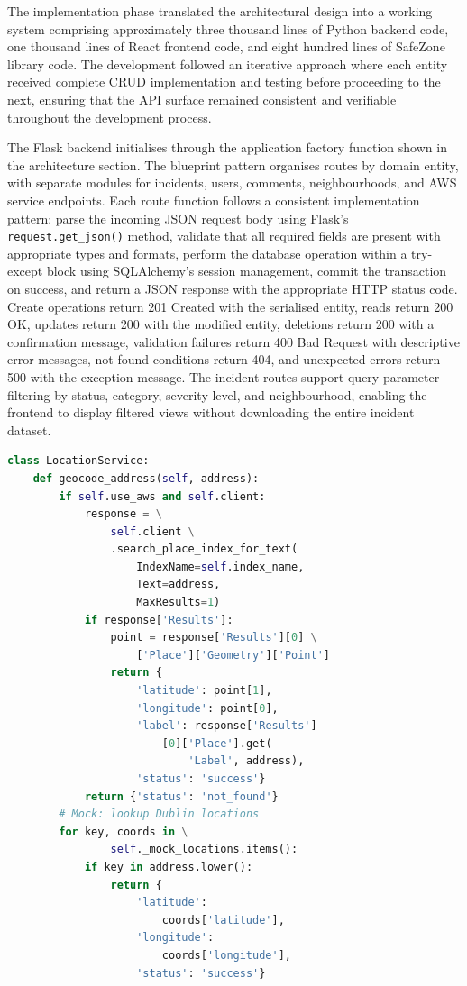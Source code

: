 \documentclass[conference]{IEEEtran}
\begin{document}
The implementation phase translated the architectural design into a working system comprising approximately three thousand lines of Python backend code, one thousand lines of React frontend code, and eight hundred lines of SafeZone library code. The development followed an iterative approach where each entity received complete CRUD implementation and testing before proceeding to the next, ensuring that the API surface remained consistent and verifiable throughout the development process.

The Flask backend initialises through the application factory function shown in the architecture section. The blueprint pattern organises routes by domain entity, with separate modules for incidents, users, comments, neighbourhoods, and AWS service endpoints. Each route function follows a consistent implementation pattern: parse the incoming JSON request body using Flask's \texttt{request.get\_json()} method, validate that all required fields are present with appropriate types and formats, perform the database operation within a try-except block using SQLAlchemy's session management, commit the transaction on success, and return a JSON response with the appropriate HTTP status code. Create operations return 201 Created with the serialised entity, reads return 200 OK, updates return 200 with the modified entity, deletions return 200 with a confirmation message, validation failures return 400 Bad Request with descriptive error messages, not-found conditions return 404, and unexpected errors return 500 with the exception message. The incident routes support query parameter filtering by status, category, severity level, and neighbourhood, enabling the frontend to display filtered views without downloading the entire incident dataset.

\begin{lstlisting}[language=Python, caption=Location Service geocoding integration]
class LocationService:
    def geocode_address(self, address):
        if self.use_aws and self.client:
            response = \
                self.client \
                .search_place_index_for_text(
                    IndexName=self.index_name,
                    Text=address,
                    MaxResults=1)
            if response['Results']:
                point = response['Results'][0] \
                    ['Place']['Geometry']['Point']
                return {
                    'latitude': point[1],
                    'longitude': point[0],
                    'label': response['Results']
                        [0]['Place'].get(
                            'Label', address),
                    'status': 'success'}
            return {'status': 'not_found'}
        # Mock: lookup Dublin locations
        for key, coords in \
                self._mock_locations.items():
            if key in address.lower():
                return {
                    'latitude':
                        coords['latitude'],
                    'longitude':
                        coords['longitude'],
                    'status': 'success'}
\end{lstlisting}
\end{document}
